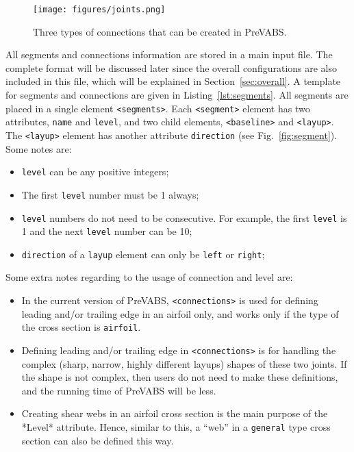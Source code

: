 \documentclass{book}
\begin{document}
\begin{figure}
  \centerline{\texttt{[image: figures/joints.png]}}
  \caption{Three types of connections that can be created in PreVABS.}
  \label{fig:joints}
\end{figure}

All segments and connections information are stored in a main input file. 
The complete format will be discussed later since the overall configurations 
are also included in this file, which will be explained in Section~\ref{sec:overall}. 
A template for segments and connections are given in Listing~\ref{lst:segments}. 
All segments are placed in a single element \lstinline{<segments>}. Each 
\lstinline{<segment>} element has two attributes, \lstinline{name} and 
\lstinline{level}, and two child elements, \lstinline{<baseline>} and 
\lstinline{<layup>}. The \lstinline{<layup>} element has another attribute 
\lstinline{direction} (see Fig.~\ref{fig:segment}). Some notes are:
\begin{itemize}
  \item \lstinline{level} can be any positive integers;
  \item The first \lstinline{level} number must be 1 always;
  \item \lstinline{level} numbers do not need to be consecutive. For 
    example, the first \lstinline{level} is 1 and the next \lstinline{level} 
    number can be 10;
  \item \lstinline{direction} of a \lstinline{layup} element can only be 
    \lstinline{left} or \lstinline{right};
\end{itemize}

Some extra notes regarding to the usage of connection and level are:

\begin{itemize}
  \item In the current version of PreVABS, \lstinline{<connections>} is 
    used for defining leading and/or trailing edge in an airfoil only, 
    and works only if the type of the cross section is \lstinline{airfoil}.
  \item Defining leading and/or trailing edge in \lstinline{<connections>} 
    is for handling the complex (sharp, narrow, highly different layups) 
    shapes of these two joints. If the shape is not complex, then users 
    do not need to make these definitions, and the running time of PreVABS 
    will be less.
  \item Creating shear webs in an airfoil cross section is the main 
    purpose of the *Level* attribute. Hence, similar to this, a ``web'' 
    in a \lstinline{general} type cross section can also be defined this way.
\end{itemize}
\end{document}
